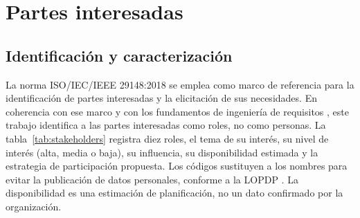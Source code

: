 \section{Partes interesadas}
\sloppy

\subsection{Identificaci\'on y caracterizaci\'on}
La norma ISO/IEC/IEEE 29148:2018 \cite{iso29148} se emplea como marco de referencia para la identificación de partes interesadas y la elicitación de sus necesidades. En coherencia con ese marco y con los fundamentos de ingenier\'ia de requisitos \cite{pohl2025}, este trabajo identifica a las partes interesadas como roles, no como personas. La tabla~\ref{tab:stakeholders} registra diez roles, el tema de su inter\'es, su nivel de inter\'es (alta, media o baja), su influencia, su disponibilidad estimada y la estrategia de participaci\'on propuesta. Los c\'odigos sustituyen a los nombres para evitar la publicaci\'on de datos personales, conforme a la LOPDP \cite{lopdp2021}. La disponibilidad es una estimaci\'on de planificaci\'on, no un dato confirmado por la organizaci\'on.

